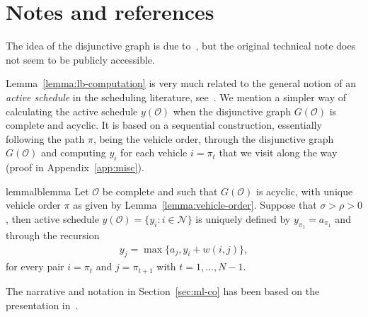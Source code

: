 \documentclass[a4paper]{report}
\theoremstyle{definition}
\theoremstyle{plain}
\begin{document}
% 

% 

\clearpage
\section{Notes and references}

The idea of the disjunctive graph is due to~\cite{roy1964disjunctive}, but the
original technical note does not seem to be publicly accessible.

Lemma~\ref{lemma:lb-computation} is very much related to the general notion of an \emph{active schedule} in
the scheduling literature, see~\cite[Definition 2.3.3]{pinedoSchedulingTheoryAlgorithms2016}.
%
We mention a simpler way of calculating the active schedule $y(\mathcal{O})$
when the disjunctive graph $G(\mathcal{O})$ is complete and acyclic.
%
It is based on a sequential construction, essentially following the path $\pi$,
being the vehicle order, through the disjunctive graph $G(\mathcal{O})$ and
computing $y_i$ for each vehicle $i = \pi_t$ that we visit along the way (proof
in Appendix~\ref{app:misc}).

\begin{restatable}{lemma}{lblemma}\label{lemma:lb-computation}
  Let $\mathcal{O}$ be complete and such that $G(\mathcal{O})$ is acyclic, with
  unique vehicle order $\pi$ as given by Lemma~\ref{lemma:vehicle-order}.
  Suppose that $\sigma > \rho > 0$, then active schedule
  $y(\mathcal{O}) = \{y_i : i \in \mathcal{N}\}$ is uniquely defined by
  $y_{\pi_1} = a_{\pi_1}$ and through the recursion
\begin{align}
  \label{eq:lb-computation}
  y_{j} = \max \{ a_{j}, y_i + w(i, j) \} ,
\end{align}
for every pair $i = \pi_t$ and $j = \pi_{t+1}$ with $t = 1, \dots, N-1$.
\end{restatable}

The narrative and notation in Section~\ref{sec:ml-co} has been based on the
presentation in~\cite{bengioMachineLearningCombinatorial2020}.


\end{document}
